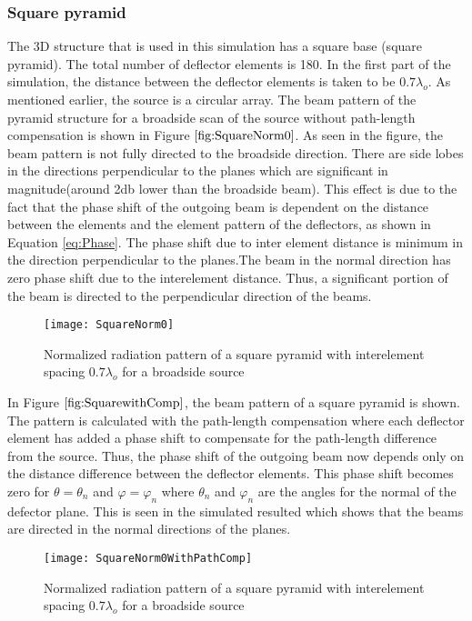 \documentclass[titlepage]{article}
\begin{document}
\subsubsection{Square pyramid}
The 3D structure that is used in this simulation has a square base (square pyramid). The total number of deflector elements is 180. In the first part of the simulation, the distance between the deflector elements is taken to be $0.7 \lambda_o$. As mentioned earlier, the source is a circular array. The beam pattern of the pyramid structure for a broadside scan of the source without path-length compensation is shown in Figure $\ref{fig:SquareNorm0}$. As seen in the figure, the beam pattern is not fully directed to the broadside direction. There are side lobes in the directions perpendicular to the planes which are significant in magnitude(around 2db lower than the broadside beam). This effect is due to the fact that the phase shift of the outgoing beam is dependent on the distance between the elements and the element pattern of the deflectors, as shown in Equation \ref{eq:Phase}. The phase shift due to inter element distance is minimum in the direction perpendicular to the planes.The beam in the normal direction has zero phase shift due to the interelement distance. Thus, a significant portion of the beam is directed to the perpendicular direction of the beams.
\begin{figure}[!hbp]
\centering
\texttt{[image: SquareNorm0]}
\caption{Normalized radiation pattern of a square pyramid with interelement spacing $0.7 \lambda_o$ for a broadside source}
\label{fig:SquareNorm0}
\end{figure}
\newline
In Figure $\ref{fig:SquarewithComp}$, the beam pattern of a square pyramid is shown. The pattern is calculated with the path-length compensation where each deflector element has added a phase shift to compensate for the path-length difference from the source. Thus, the phase shift of the outgoing beam now depends only on the distance difference between the deflector elements. This phase shift becomes zero for $\theta=\theta_n$ and $\varphi=\varphi_n$ where $\theta_n$ and $\varphi_n$ are the angles for the normal of the defector plane. This is seen in the simulated resulted which shows that the beams are directed in the normal directions of the planes.
\begin{figure}[!hbp]
\centering
\texttt{[image: SquareNorm0WithPathComp]}
\caption{Normalized radiation pattern of a square pyramid with interelement spacing $0.7 \lambda_o$ for a broadside source}
\label{fig:SquarewithComp}
\end{figure}
\end{document}
